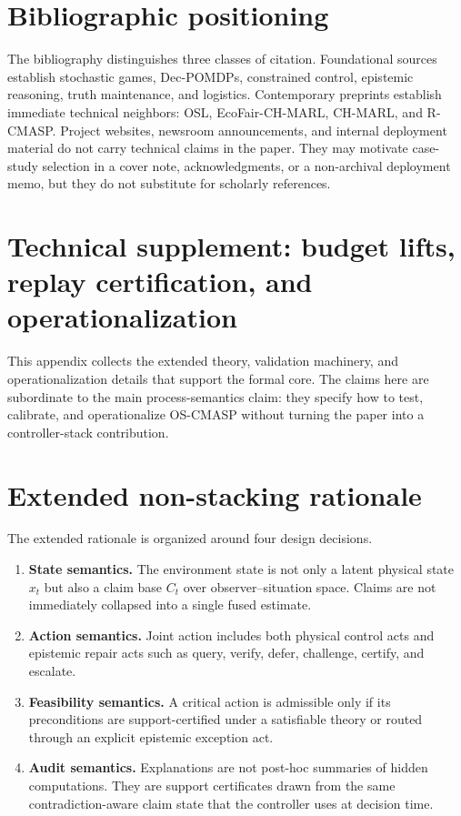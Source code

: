 \documentclass[11pt]{article}
\newcommand{\1}{\mathbf{1}}
\theoremstyle{definition}
\theoremstyle{plain}
\theoremstyle{remark}
\begin{document}
\section{Bibliographic positioning}
\label{app:ref-policy}

The bibliography distinguishes three classes of citation. Foundational sources establish stochastic games, Dec-POMDPs, constrained control, epistemic reasoning, truth maintenance, and logistics. Contemporary preprints establish immediate technical neighbors: OSL, EcoFair-CH-MARL, CH-MARL, and R-CMASP. Project websites, newsroom announcements, and internal deployment material do not carry technical claims in the paper. They may motivate case-study selection in a cover note, acknowledgments, or a non-archival deployment memo, but they do not substitute for scholarly references.

\section{Technical supplement: budget lifts, replay certification, and operationalization}
\label{app:extended-technical-supplement}

This appendix collects the extended theory, validation machinery, and operationalization details that support the formal core. The claims here are subordinate to the main process-semantics claim: they specify how to test, calibrate, and operationalize OS-CMASP without turning the paper into a controller-stack contribution.

\section{Extended non-stacking rationale}

The extended rationale is organized around four design decisions.

\begin{enumerate}[leftmargin=1.7em,label=\arabic*.]
\item \textbf{State semantics.} The environment state is not only a latent physical state $x_t$ but also a claim base $C_t$ over observer--situation space. Claims are not immediately collapsed into a single fused estimate.
\item \textbf{Action semantics.} Joint action includes both physical control acts and epistemic repair acts such as query, verify, defer, challenge, certify, and escalate.
\item \textbf{Feasibility semantics.} A critical action is admissible only if its preconditions are support-certified under a satisfiable theory or routed through an explicit epistemic exception act.
\item \textbf{Audit semantics.} Explanations are not post-hoc summaries of hidden computations. They are support certificates drawn from the same contradiction-aware claim state that the controller uses at decision time.
\end{enumerate}
\end{document}
